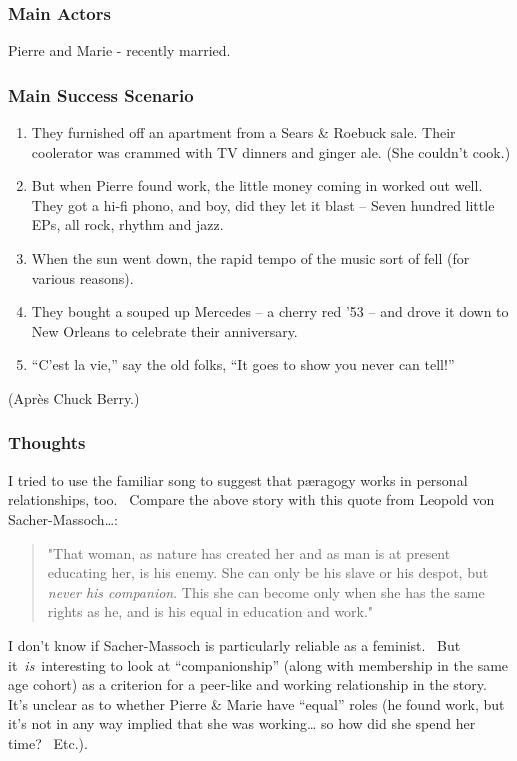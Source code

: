\subsubsection{Main Actors}

Pierre and Marie - recently married.

\subsubsection{Main Success Scenario}

\begin{enumerate}
\item
  They furnished off an apartment from a Sears \& Roebuck sale. Their
  coolerator was crammed with TV dinners and ginger ale. (She couldn't
  cook.)
\item
  But when Pierre found work, the little money coming in worked out
  well. They got a hi-fi phono, and boy, did they let it blast -- Seven
  hundred little EPs, all rock, rhythm and jazz.
\item
  When the sun went down, the rapid tempo of the music sort of fell (for
  various reasons).
\item
  They bought a souped up Mercedes -- a cherry red '53 -- and drove it
  down to New Orleans to celebrate their anniversary.
\item
  ``C'est la vie,'' say the old folks, ``It goes to show you never can
  tell!''
\end{enumerate}

(Après Chuck Berry.)

\subsubsection{Thoughts}

I tried to use the familiar song to suggest that pæragogy works in
personal relationships, too.~ Compare the above story with this quote
from Leopold von Sacher-Massoch\ldots{}:

\begin{quote}
"That woman, as nature has created her and as man is at present
educating her, is his enemy. She can only be his slave or his despot,
but \emph{never his companion}. This she can become only when she has
the same rights as he, and is his equal in education and work."
\end{quote}

I don't know if Sacher-Massoch is particularly reliable as a feminist.~
But it~\emph{is}~interesting to look at ``companionship'' (along with
membership in the same age cohort) as a criterion for a peer-like and
working relationship in the story.~ It's unclear as to whether Pierre \&
Marie have ``equal'' roles (he found work, but it's not in any way
implied that she was working\ldots{} so how did she spend her time?~
Etc.).
